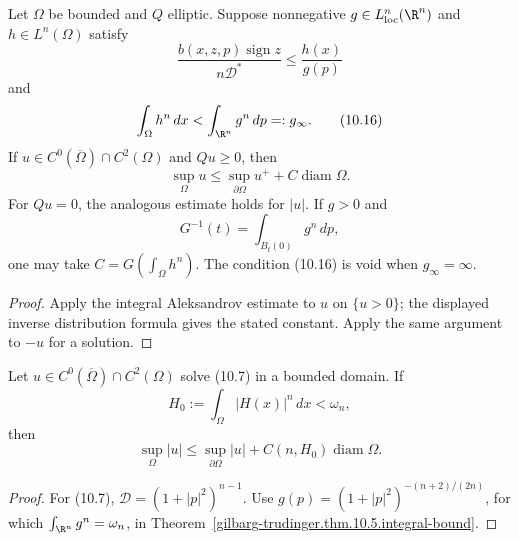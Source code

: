\begin{theorem}
\label{gilbarg-trudinger.thm.10.5.integral-bound}
Let $\Omega$ be bounded and $Q$ elliptic.  Suppose nonnegative
$g\in L^n_{\mathrm{loc}}(\R^n)$ and $h\in L^n(\Omega)$ satisfy
\begin{equation}
\frac{b(x,z,p)\operatorname{sign}z}{n\mathscr D^*}
\le\frac{h(x)}{g(p)}
\tag{10.15}
\end{equation}
and
\begin{equation}
\int_\Omega h^n\,dx<\int_{\R^n}g^n\,dp=:g_\infty.
\tag{10.16}
\end{equation}
If $u\in C^0(\overline\Omega)\cap C^2(\Omega)$ and $Qu\ge0$, then
\begin{equation}
\sup_\Omega u\le\sup_{\partial\Omega}u^++C\operatorname{diam}\Omega.
\tag{10.17}
\end{equation}
For $Qu=0$, the analogous estimate holds for $|u|$.  If $g>0$ and
\[
G^{-1}(t)=\int_{B_t(0)}g^n\,dp,
\]
one may take $C=G(\int_\Omega h^n)$.  The condition \textup{(10.16)} is
void when $g_\infty=\infty$.
\end{theorem}
\begin{proof}
\sketch Apply the integral Aleksandrov estimate to $u$ on $\{u>0\}$;
the displayed inverse distribution formula gives the stated constant.  Apply
the same argument to $-u$ for a solution.
\end{proof}

\begin{corollary}
\label{gilbarg-trudinger.cor.10.6.prescribed-mean-curvature-bound}
Let $u\in C^0(\overline\Omega)\cap C^2(\Omega)$ solve
\textup{(10.7)} in a bounded domain.  If
\begin{equation}
H_0:=\int_\Omega|H(x)|^n\,dx<\omega_n,
\tag{10.18}
\end{equation}
then
\begin{equation}
\sup_\Omega|u|\le\sup_{\partial\Omega}|u|
+C(n,H_0)\operatorname{diam}\Omega.
\tag{10.19}
\end{equation}
\end{corollary}
\begin{proof}
\sketch For \textup{(10.7)},
$\mathscr D=(1+|p|^2)^{n-1}$.  Use
$g(p)=(1+|p|^2)^{-(n+2)/(2n)}$, for which
$\int_{\R^n}g^n=\omega_n$, in Theorem~\ref{gilbarg-trudinger.thm.10.5.integral-bound}.
\end{proof}

